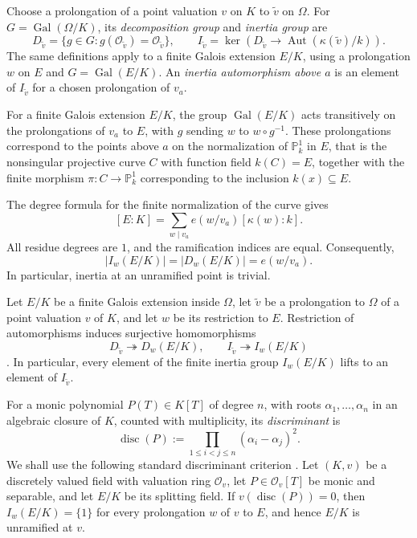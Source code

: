 \documentclass[11pt,a4paper]{amsart}
\renewcommand{\leq}{\leqslant}
\theoremstyle{definition}
\DeclareMathOperator{\Gal}{Gal}
\DeclareMathOperator{\Aut}{Aut}
\begin{document}
Choose a prolongation of a point valuation $v$ on $K$ to $\widetilde v$ on $\Omega$.
For $G=\Gal(\Omega/K)$, its \emph{decomposition group} and
\emph{inertia group} are
\[
D_{\widetilde v}
=\{g\in G:g(\mathcal O_{\widetilde v})
                         =\mathcal O_{\widetilde v}\},\qquad
I_{\widetilde v}
=\ker\!\left(D_{\widetilde v}\to
               \Aut(\kappa(\widetilde v)/k)\right).
\]
The same definitions apply to a finite Galois extension $E/K$,
using a prolongation $w$ on $E$ and $G=\Gal(E/K)$.
An \emph{inertia automorphism above $a$} is an element of
$I_{\widetilde v}$ for a chosen prolongation of $v_a$.

For a finite Galois extension $E/K$, the group $\Gal(E/K)$
acts transitively on the prolongations of $v_a$ to $E$,
with $g$ sending $w$ to $w\circ g^{-1}$.
These prolongations correspond to the points above $a$
on the normalization of $\mathbb P^1_k$ in $E$, that is the
nonsingular projective curve $C$ with function field $k(C)=E$,
together with the finite morphism $\pi:C\longrightarrow\mathbb P^1_k$
corresponding to the inclusion $k(x)\subseteq E$.

The degree formula for the finite normalization
of the curve gives
\[
[E:K]=\sum_{w\mid v_a}e(w/v_a)[\kappa(w):k].
\]
All residue degrees are $1$, and the ramification indices are equal.
Consequently,
\[
|I_w(E/K)|=|D_w(E/K)|=e(w/v_a).
\]
In particular, inertia at an unramified point is trivial.

Let $E/K$ be a finite Galois extension inside $\Omega$,
let $\widetilde v$ be a prolongation to $\Omega$ of a point
valuation $v$ of $K$, and let $w$ be its restriction to $E$.
Restriction of automorphisms induces surjective homomorphisms
\[
D_{\widetilde v}\twoheadrightarrow D_w(E/K),
\qquad
I_{\widetilde v}\twoheadrightarrow I_w(E/K)
\]
\cite[Tag~0BSX]{Stacks}.
In particular, every element of the finite inertia group
$I_w(E/K)$ lifts to an element of $I_{\widetilde v}$.

For a monic polynomial $P(T)\in K[T]$ of degree $n$, with roots
$\alpha_1,\ldots,\alpha_n$ in an algebraic closure of $K$, counted
with multiplicity, its \emph{discriminant} is
\[
\operatorname{disc}(P)
:=\prod_{1\leq i<j\leq n}(\alpha_i-\alpha_j)^2.
\]
We shall use the following standard discriminant criterion
\cite[Tags~0BJF, 0EXR, and~0BTF]{Stacks}.
Let $(K,v)$ be a discretely valued field with valuation ring
$\mathcal O_v$, let $P\in\mathcal O_v[T]$ be monic and separable,
and let $E/K$ be its splitting field.
If $v(\operatorname{disc}(P))=0$, then
$I_w(E/K)=\{1\}$ for every prolongation $w$ of $v$ to $E$,
and hence $E/K$ is unramified at $v$.
\end{document}
